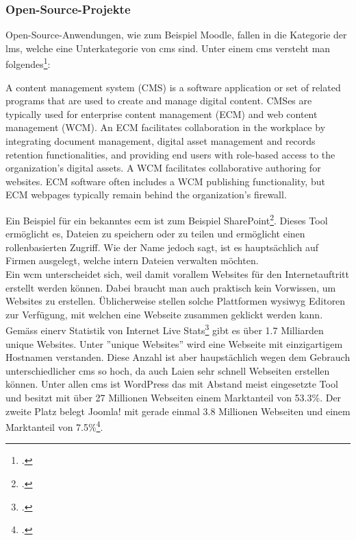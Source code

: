 \subsubsection*{Open-Source-Projekte}
Open-Source-Anwendungen, wie zum Beispiel Moodle, fallen in die Kategorie der \gls{lms}, welche eine Unterkategorie von \gls{cms} sind. Unter einem \gls{cms} versteht man folgendes\footcite{cms_definition}:

\begin{displayquote}
A content management system (CMS) is a software application or set of related programs that are used to create and manage digital content. CMSes are typically used for enterprise content management (ECM) and web content management (WCM). An ECM facilitates collaboration in the workplace by integrating document management, digital asset management and records retention functionalities, and providing end users with role-based access to the organization's digital assets. A WCM facilitates collaborative authoring for websites. ECM software often includes a WCM publishing functionality, but ECM webpages typically remain behind the organization's firewall.  
\end{displayquote}

Ein Beispiel für ein bekanntes \gls{ecm} ist zum Beispiel SharePoint\footcite{sharepoint}. Dieses Tool ermöglicht es, Dateien zu speichern oder zu teilen und ermöglicht einen rollenbasierten Zugriff. Wie der Name jedoch sagt, ist es hauptsächlich auf Firmen ausgelegt, welche intern Dateien verwalten möchten. \\

Ein \gls{wcm} unterscheidet sich, weil damit vorallem Websites für den Internetauftritt erstellt werden können. Dabei braucht man auch praktisch kein Vorwissen, um Websites zu erstellen. Üblicherweise stellen solche Plattformen \gls{wysiwyg} Editoren zur Verfügung, mit welchen eine Webseite zusammen geklickt werden kann. Gemäss einerv Statistik von Internet Live Stats\footcite{internet_live_stats} gibt es über 1.7 Milliarden unique Websites. Unter ''unique Websites'' wird eine Webseite mit einzigartigem Hostnamen verstanden. Diese Anzahl ist aber haupstächlich wegen dem Gebrauch unterschiedlicher \gls{cms} so hoch, da auch Laien sehr schnell Webseiten erstellen können. Unter allen \gls{cms} ist WordPress das mit Abstand meist eingesetzte Tool und besitzt mit über 27 Millionen Webseiten einem Marktanteil von 53.3\%. Der zweite Platz belegt Joomla! mit gerade einmal 3.8 Millionen Webseiten und einem Marktanteil von 7.5\%\footcite{cms_market_share}.\\

